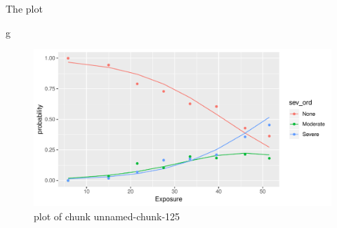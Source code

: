 \documentclass[ignorenonframetext,]{beamer}
\newenvironment{Shaded}{\begin{snugshade}}{\end{snugshade}}
\newcommand{\NormalTok}[1]{#1}
\begin{document}
\begin{frame}[fragile]{The plot}
\protect\hypertarget{the-plot-3}{}

\begin{Shaded}
\begin{Highlighting}[]
\NormalTok{g}
\end{Highlighting}
\end{Shaded}

\begin{figure}
\centering
\includegraphics{figure/unnamed-chunk-125-1.pdf}
\caption{plot of chunk unnamed-chunk-125}
\end{figure}

\end{frame}
\end{document}

